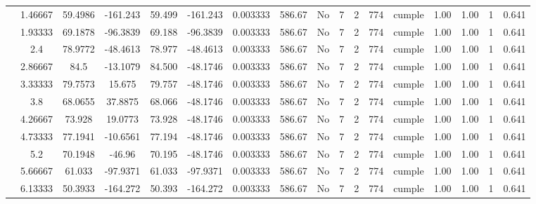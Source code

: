 \begin{table}[H]
{\begin{tabular}{|c|c|c|c|c|c|c|c|c|c|c|c|c|c|c|c|c|}
\cline{2-17}        & 1.46667 & 59.4986 & -161.243 & 59.499 & -161.243 & 0.003333 & 586.67 & No  & 7   & 2   & 774 & \cellcolor[rgb]{ .776,  .937,  .808}cumple & 1.00 & 1.00 & 1   & 0.641 \bigstrut\\
\cline{2-17}        & 1.93333 & 69.1878 & -96.3839 & 69.188 & -96.3839 & 0.003333 & 586.67 & No  & 7   & 2   & 774 & \cellcolor[rgb]{ .776,  .937,  .808}cumple & 1.00 & 1.00 & 1   & 0.641 \bigstrut\\
\cline{2-17}        & 2.4 & 78.9772 & -48.4613 & 78.977 & -48.4613 & 0.003333 & 586.67 & No  & 7   & 2   & 774 & \cellcolor[rgb]{ .776,  .937,  .808}cumple & 1.00 & 1.00 & 1   & 0.641 \bigstrut\\
\cline{2-17}        & 2.86667 & 84.5 & -13.1079 & 84.500 & -48.1746 & 0.003333 & 586.67 & No  & 7   & 2   & 774 & \cellcolor[rgb]{ .776,  .937,  .808}cumple & 1.00 & 1.00 & 1   & 0.641 \bigstrut\\
\cline{2-17}        & 3.33333 & 79.7573 & 15.675 & 79.757 & -48.1746 & 0.003333 & 586.67 & No  & 7   & 2   & 774 & \cellcolor[rgb]{ .776,  .937,  .808}cumple & 1.00 & 1.00 & 1   & 0.641 \bigstrut\\
\cline{2-17}        & 3.8 & 68.0655 & 37.8875 & 68.066 & -48.1746 & 0.003333 & 586.67 & No  & 7   & 2   & 774 & \cellcolor[rgb]{ .776,  .937,  .808}cumple & 1.00 & 1.00 & 1   & 0.641 \bigstrut\\
\cline{2-17}        & 4.26667 & 73.928 & 19.0773 & 73.928 & -48.1746 & 0.003333 & 586.67 & No  & 7   & 2   & 774 & \cellcolor[rgb]{ .776,  .937,  .808}cumple & 1.00 & 1.00 & 1   & 0.641 \bigstrut\\
\cline{2-17}        & 4.73333 & 77.1941 & -10.6561 & 77.194 & -48.1746 & 0.003333 & 586.67 & No  & 7   & 2   & 774 & \cellcolor[rgb]{ .776,  .937,  .808}cumple & 1.00 & 1.00 & 1   & 0.641 \bigstrut\\
\cline{2-17}        & 5.2 & 70.1948 & -46.96 & 70.195 & -48.1746 & 0.003333 & 586.67 & No  & 7   & 2   & 774 & \cellcolor[rgb]{ .776,  .937,  .808}cumple & 1.00 & 1.00 & 1   & 0.641 \bigstrut\\
\cline{2-17}        & 5.66667 & 61.033 & -97.9371 & 61.033 & -97.9371 & 0.003333 & 586.67 & No  & 7   & 2   & 774 & \cellcolor[rgb]{ .776,  .937,  .808}cumple & 1.00 & 1.00 & 1   & 0.641 \bigstrut\\
\cline{2-17}        & 6.13333 & 50.3933 & -164.272 & 50.393 & -164.272 & 0.003333 & 586.67 & No  & 7   & 2   & 774 & \cellcolor[rgb]{ .776,  .937,  .808}cumple & 1.00 & 1.00 & 1   & 0.641 \bigstrut\\

\end{tabular}}
\end{table}
